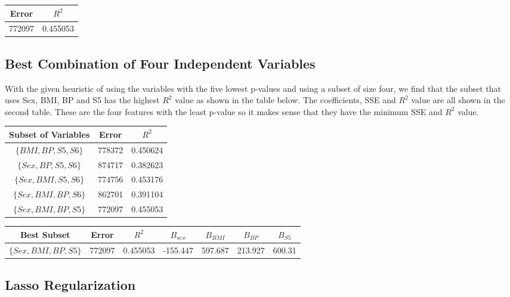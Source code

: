 \documentclass[15pt,a4paper,openright]{article}
\begin{document}
\begin{center}
 \begin{tabular}{||c | c||} 
 \hline
 Error & $R^2$  \\ [0.5ex] 
 \hline\hline
 772097 & 0.455053   \\ 
 [1ex] 
 \hline
\end{tabular}
\end{center}

\subsection{Best Combination of Four Independent Variables}

With the given heuristic of using the variables with the five lowest p-values and using a subset of size four, we find that the subset that uses Sex, BMI, BP and S5 has the highest $R^2$ value as shown in the table below. The coefficients, SSE and $R^2$ value are all shown in the second table. These are the four features with the least p-value so it makes sense that they have the minimum SSE and $R^2$ value. 

\begin{center}
 \begin{tabular}{||c | c | c||} 
 \hline
 Subset of Variables & Error & $R^2$  \\ [0.5ex] 
 \hline\hline
 $\{BMI, BP, S5, S6\}$ & 778372 & 0.450624   \\
 $\{Sex, BP, S5, S6\}$ & 874717 & 0.382623 \\
 $\{Sex, BMI, S5, S6\}$ & 774756 & 0.453176 \\
$\{Sex, BMI, BP, S6\}$ & 862701 & 0.391104 \\
 $\{Sex, BMI, BP, S5\}$ & 772097 & 0.455053 \\
 [1ex] 
 \hline
\end{tabular}
\end{center}

\begin{center}
 \begin{tabular}{||c | c | c | c | c | c | c||} 
 \hline
 Best Subset & Error & $R^2$ & $B_{sex}$ & $B_{BMI}$ & $B_{BP}$ & $B_{S5}$ \\ [0.5ex] 
 \hline\hline
 $\{Sex, BMI, BP, S5\}$ & 772097 & 0.455053 & -155.447 & 597.687 & 213.927 & 600.31 \\
 [1ex] 
 \hline
\end{tabular}
\end{center}

\subsection{Lasso Regularization}
\end{document}
